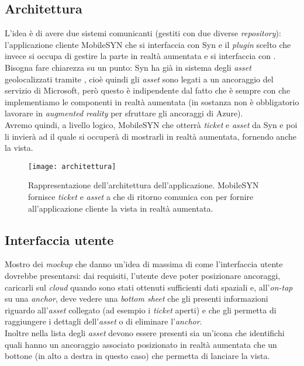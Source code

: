\subsection{Architettura}
L'idea è di avere due sistemi comunicanti (gestiti con due diverse \textit{repository}): l'applicazione cliente MobileSYN che si interfaccia con Syn e il \textit{plugin} scelto che invece si occupa di gestire la parte in realtà aumentata e si interfaccia con \asa{}.\\
Bisogna fare chiarezza su un punto: Syn ha già in sistema degli \textit{asset} geolocalizzati tramite \asa{}, cioè quindi gli \textit{asset} sono legati a un ancoraggio del servizio di Microsoft, però questo è indipendente dal fatto che è sempre con \asa{} che implementiamo le componenti in realtà aumentata (in sostanza non è obbligatorio lavorare in \textit{augmented reality} per sfruttare gli ancoraggi di Azure).\\
Avremo quindi, a livello logico, MobileSYN che otterrà \textit{ticket} e \textit{asset} da Syn e poi li invierà ad \aplug{} il quale si occuperà di mostrarli in realtà aumentata, fornendo anche la vista.

\begin{figure}[H]
  \centering
  \texttt{[image: architettura]}\hfill
  \caption[Architettura \textit{app}]{Rappresentazione dell'architettura dell'applicazione. MobileSYN fornisce \textit{ticket} e \textit{asset} a \aplug{} che di ritorno comunica con \asa{} per fornire all'applicazione cliente la vista in realtà aumentata.}
\end{figure}

\subsection{Interfaccia utente}
Mostro dei \textit{mockup} che danno un'idea di massima di come l'interfaccia utente dovrebbe presentarsi: dai requisiti, l'utente deve poter posizionare ancoraggi, caricarli sul \textit{cloud} quando sono stati ottenuti sufficienti dati spaziali e, all'\textit{on-tap} su una \textit{anchor}, deve vedere una \textit{bottom sheet} che gli presenti informazioni riguardo all'\textit{asset} collegato (ad esempio i \textit{ticket} aperti) e che gli permetta di raggiungere i dettagli dell'\textit{asset} o di eliminare l'\textit{anchor}.\\
Inoltre nella lista degli \textit{asset} devono essere presenti sia un'icona che identifichi quali hanno un ancoraggio associato posizionato in realtà aumentata che un bottone (in alto a destra in questo caso) che permetta di lanciare la vista.

